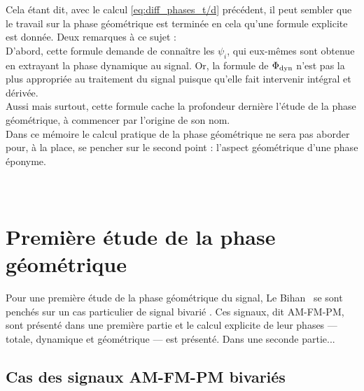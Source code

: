 Cela étant dit, avec le calcul \eqref{eq:diff_phases_t/d} précédent, il peut sembler que le travail sur la phase géométrique est terminée en cela qu'une formule explicite est donnée. Deux remarques à ce sujet :
\\
D'abord, cette formule demande de connaître les $\psi_i$, qui eux-mêmes sont obtenue en extrayant la phase dynamique au signal. Or, la formule de $\Phi_{\text{\normalfont dyn}}$ n'est pas la plus appropriée au traitement du signal puisque qu'elle fait intervenir intégral et dérivée.
\\
Aussi mais surtout, cette formule cache la profondeur dernière l'étude de la phase géométrique, à commencer par l'origine de son nom.
\\
Dans ce mémoire le calcul pratique de la phase géométrique ne sera pas aborder pour, à la place, se pencher sur le second point : l'aspect géométrique d'une phase éponyme.
\\ \\

\\



\section{Première étude de la phase géométrique} \label{sec:AM-FM-PM}

Pour une première étude de la phase géométrique du signal, Le Bihan \etal~se sont penchés sur un cas particulier de signal bivarié \cite{flamant_timefrequency_2019,le_bihan_modephysiques_2023, le_bihan_geometric_2024}. Ces signaux, dit AM-FM-PM, sont présenté dans une première partie et le calcul explicite de leur phases --- totale, dynamique et géométrique --- est présenté. Dans une seconde partie... 
\\



\subsection{Cas des signaux AM-FM-PM bivariés} \label{subsec:AM-FM-PM}

